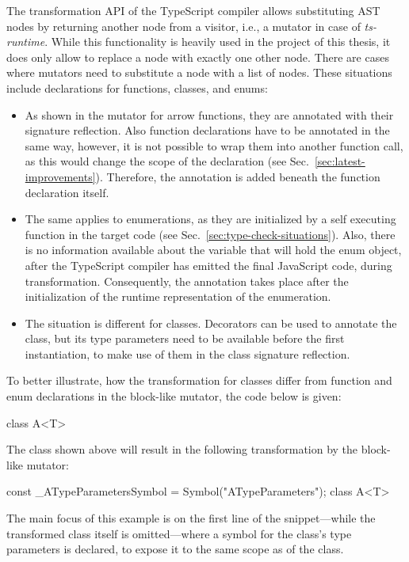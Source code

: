 The transformation API of the TypeScript compiler allows substituting AST nodes by returning another node from a visitor, i.e., a mutator in case of \emph{ts-runtime}. While this functionality is heavily used in the project of this thesis, it does only allow to replace a node with exactly one other node. There are cases where mutators need to substitute a node with a list of nodes. These situations include declarations for functions, classes, and enums:
\begin{itemize}
  \item As shown in the mutator for arrow functions, they are annotated with their signature reflection. Also function declarations have to be annotated in the same way, however, it is not possible to wrap them into another function call, as this would change the scope of the declaration (see Sec.~\ref{sec:latest-improvements}). Therefore, the annotation is added beneath the function declaration itself.
  \item The same applies to enumerations, as they are initialized by a self executing function in the target code (see Sec.~\ref{sec:type-check-situations}). Also, there is no information available about the variable that will hold the enum object, after the TypeScript compiler has emitted the final JavaScript code, during transformation. Consequently, the annotation takes place after the initialization of the runtime representation of the enumeration.
  \item The situation is different for classes. Decorators can be used to annotate the class, but its type parameters need to be available before the first instantiation, to make use of them in the class signature reflection.
\end{itemize}
To better illustrate, how the transformation for classes differ from function and enum declarations in the block-like mutator, the code below is given:
\begin{JsCode}[numbers=none]
class A<T> { }
\end{JsCode}
The class shown above will result in the following transformation by the block-like mutator:
\begin{JsCode}[numbers=none]
const _ATypeParametersSymbol = Symbol("ATypeParameters");
class A<T> { }
\end{JsCode}
The main focus of this example is on the first line of the snippet---while the transformed class itself is omitted---where a symbol for the class's type parameters is declared, to expose it to the same scope as of the class.

